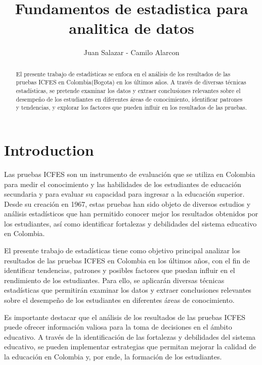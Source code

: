 \documentclass{article}
\title{Fundamentos de estadistica para analitica de datos}
\author{Juan Salazar - Camilo Alarcon}
\begin{document}
\maketitle
\thispagestyle{fancy}

\begin{abstract}

El presente trabajo de estadísticas se enfoca en el análisis de los resultados de las pruebas ICFES en Colombia(Bogota) en los últimos años. A través de diversas técnicas estadísticas, se pretende examinar los datos y extraer conclusiones relevantes sobre el desempeño de los estudiantes en diferentes áreas de conocimiento, identificar patrones y tendencias, y explorar los factores que pueden influir en los resultados de las pruebas. \hfill \break

\end{abstract}

\section{Introduction}

Las pruebas ICFES son un instrumento de evaluación que se utiliza en Colombia para medir el conocimiento y las habilidades de los estudiantes de educación secundaria y para evaluar su capacidad para ingresar a la educación superior. Desde su creación en 1967, estas pruebas han sido objeto de diversos estudios y análisis estadísticos que han permitido conocer mejor los resultados obtenidos por los estudiantes, así como identificar fortalezas y debilidades del sistema educativo en Colombia. \hfill \break

El presente trabajo de estadísticas tiene como objetivo principal analizar los resultados de las pruebas ICFES en Colombia en los últimos años, con el fin de identificar tendencias, patrones y posibles factores que puedan influir en el rendimiento de los estudiantes. Para ello, se aplicarán diversas técnicas estadísticas que permitirán examinar los datos y extraer conclusiones relevantes sobre el desempeño de los estudiantes en diferentes áreas de conocimiento. \hfill \break

Es importante destacar que el análisis de los resultados de las pruebas ICFES puede ofrecer información valiosa para la toma de decisiones en el ámbito educativo. A través de la identificación de las fortalezas y debilidades del sistema educativo, se pueden implementar estrategias que permitan mejorar la calidad de la educación en Colombia y, por ende, la formación de los estudiantes. \hfill \break
\end{document}
